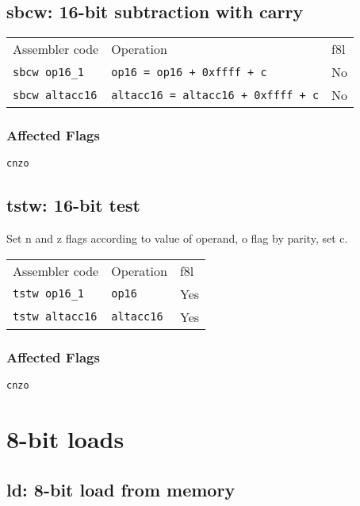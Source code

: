 \documentclass{book}
\begin{document}
\subsection{sbcw: 16-bit subtraction with carry}

\begin{tabular}{l l l}
Assembler code         & Operation                                 & f8l \\
\texttt{sbcw op16\_1}  & \texttt{op16 = op16 + 0xffff + c}         & No \\
\texttt{sbcw altacc16} & \texttt{altacc16 = altacc16 + 0xffff + c} & No
\end{tabular}

\subsubsection*{Affected Flags}

\texttt{cnzo}


\subsection{tstw: 16-bit test}

Set n and z flags according to value of operand, o flag by parity, set c.

\begin{tabular}{l l l}
Assembler code         & Operation         & f8l \\
\texttt{tstw op16\_1}  & \texttt{op16}     & Yes \\
\texttt{tstw altacc16} & \texttt{altacc16} & Yes
\end{tabular}

\subsubsection*{Affected Flags}

\texttt{cnzo}


\section{8-bit loads}

\subsection{ld: 8-bit load from memory}
\end{document}
